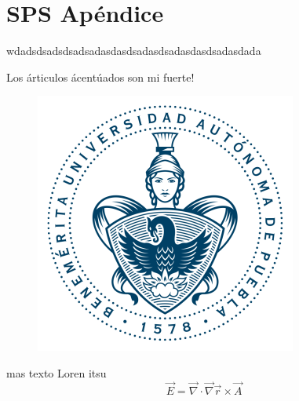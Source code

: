 \chapter{SPS Apéndice}
wdadsdsadsdsadsadasdasdsadasdsadasdasdsadasdada
            
Los árticulos ácentúados son mi fuerte!
\begin{figure}[!h]
\centering
\includegraphics[width=.2\textwidth,keepaspectratio=true]{escudo-2}
\end{figure}

mas texto Loren itsu
\[ \vec E = \vec \nabla \cdot \vec \nabla \vec r \times \vec A
\]
